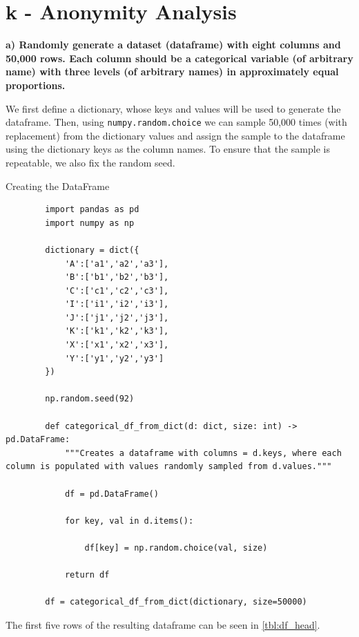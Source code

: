\documentclass{article}
\begin{document}

\section{k - Anonymity Analysis}


\textbf{a) Randomly generate a dataset (dataframe) with eight columns and 50,000 rows. Each column should be a categorical variable (of arbitrary name) with three levels (of arbitrary names) in approximately equal proportions.}

\vspace{\baselineskip} 

We first define a dictionary, whose keys and values will be used to generate the dataframe.
Then, using \texttt{numpy.random.choice} we can sample 50,000 times (with replacement) from the dictionary values and assign the sample to the dataframe using the dictionary keys as the column names. To ensure that the sample is repeatable, we also fix the random seed.

\begin{mybox}[colbacktitle=green]{Creating the DataFrame}
    \begin{verbatim}
        import pandas as pd
        import numpy as np

        dictionary = dict({
            'A':['a1','a2','a3'],
            'B':['b1','b2','b3'],
            'C':['c1','c2','c3'],
            'I':['i1','i2','i3'],
            'J':['j1','j2','j3'],
            'K':['k1','k2','k3'],
            'X':['x1','x2','x3'],
            'Y':['y1','y2','y3']
        })

        np.random.seed(92)

        def categorical_df_from_dict(d: dict, size: int) -> pd.DataFrame:
            """Creates a dataframe with columns = d.keys, where each column is populated with values randomly sampled from d.values."""

            df = pd.DataFrame()

            for key, val in d.items():

                df[key] = np.random.choice(val, size)

            return df

        df = categorical_df_from_dict(dictionary, size=50000)
    \end{verbatim}
\end{mybox}

The first five rows of the resulting dataframe can be seen in \cref{tbl:df_head}.
\end{document}
